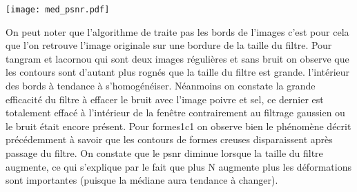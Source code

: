 \documentclass[12pt]{article}
\numberwithin{equation}{section}
\begin{document}
\begin{center}
\texttt{[image: med\_psnr.pdf]}\\
\end{center}

On peut noter que l'algorithme de traite pas les bords de l'images c'est pour cela que l'on retrouve l'image originale sur une bordure de la taille du filtre. Pour tangram et lacornou qui sont deux images régulières et sans bruit on observe que les contours sont d'autant plus rognés que la taille du filtre est grande. l'intérieur des bords à tendance à s'homogénéiser. Néanmoins on constate la grande efficacité du filtre à effacer le bruit avec l'image poivre et sel, ce dernier est totalement effacé à l'intérieur de la fenêtre contrairement au filtrage gaussien ou le bruit était encore présent. Pour formes1c1 on observe bien le phénomène décrit précédemment à savoir que les contours de formes creuses disparaissent après passage du filtre. On constate que le psnr diminue lorsque la taille du filtre augmente, ce qui s'explique par le fait que plus N augmente plus les déformations sont importantes (puisque la médiane aura tendance à changer).
\end{document}
